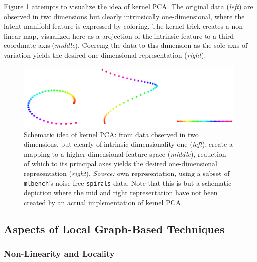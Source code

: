 Figure \ref{fig:spirals} attempts to visualize the idea of kernel PCA.
The original data (\textit{left}) are observed in two dimensions but clearly 
intrinsically one-dimensional, where the latent manifold feature is expressed by 
coloring. 
The kernel trick creates a non-linear map, visualized here as a projection of 
the intrinsic feature to a third coordinate axis (\textit{middle}). 
Coercing the data to this dimension as the sole axis of variation yields the 
desired one-dimensional representation (\textit{right}). 

\begin{figure}[H]
  \centering
  \includegraphics[width = \textwidth]{figures/spirals}
  \caption[Schematic idea of kernel PCA]{Schematic idea of kernel PCA: from data
  observed in two dimensions, but clearly of intrinsic dimensionality one 
  (\textit{left}), create a mapping to a higher-dimensional feature space 
  (\textit{middle}), reduction of which to its principal axes yields the desired 
  one-dimensional representation (\textit{right}).
  \textit{Source:} own representation, using a subset of \texttt{mlbench}'s 
  noise-free \texttt{spirals} data. Note that this is but a schematic depiction 
  where the mid and right representation have not been created by an actual 
  implementation of kernel PCA.}
  \label{fig:spirals}
\end{figure}


\subsection{Aspects of Local Graph-Based Techniques}
\label{lgb-properties}


\subsubsection{Non-Linearity and Locality}
\label{nonlin-local}

